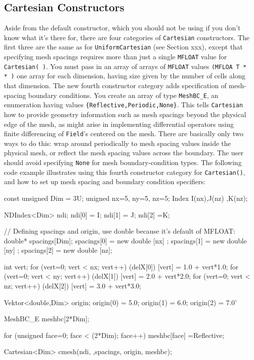 \subsection{Cartesian Constructors} 
Aside from the default constructor, which you should not be using if you don't know what it's there for, there are four categories of \texttt{Cartesian} constructors. 
The first three are the same as for \texttt{UniformCartesian} (see Section xxx), except that specifying mesh spacings requires more than just a single \texttt{MFLOAT} value for \texttt{Cartesian( )}. 
You must pass in an array of arrays of \texttt{MFLOAT} values \texttt{(MFLOA T * * )} one array for each dimension, having size given by the number of cells along that dimension. 
The new fourth constructor category adds specification of mesh-spacing boundary conditions. 
You create an array of type \texttt{MeshBC\_E}, an enumeration having values \texttt{\{Reflective,Periodic,None\}}. This tells \texttt{Cartesian} how to provide geometry information such as 
mesh spacings beyond the physical edge of the mesh, as might arise in implementing differential operators using finite differencing of \texttt{Field}'s centered on the mesh. There are 
basically only two ways to do this: wrap around periodically to mesh spacing values inside the physical mesh, or reflect the mesh spacing values across the boundary. The user should 
avoid specifying \texttt{None} for mesh boundary-condition types. The following code example illustrates using this fourth constructor category for \texttt{Cartesian()}, and how to set up 
mesh spacing and boundary condition specifiers: 
\begin{smallcode}

const unsigned Dim = 3U;
unigned nx=5, ny=5, nz=5; 
Index I(nx),J(nz) ,K(nz);

NDIndex<Dim> ndi; 
ndi[0] = I; ndi[1] = J; ndi[2] =K; 

// Defining spacings and origin, use double because it's default of MFLOAT: 
double* spacings[Dim]; 
spacings[0] = new double [nx] ; 
spacings[1] = new double [ny] ; 
spacings[2] = new double [nz];
 
int vert; 
for (vert=0; vert < nx; vert++) (delX[0]) [vert] = 1.0 + vert*1.0;
for (vert=0; vert < ny; vert++) (delX[1]) [vert] = 2.0 + vert*2.0;
for (vert=0; vert < nz; vert++) (delX[2]) [vert] = 3.0 + vert*3.0;

Vektor<double,Dim> origin; 
origin(0) = 5.0; 
origin(1) = 6.0; 
origin(2) = 7.0'

MeshBC_E meshbc[2*Dim];
 
for (unsigned face=0; face < (2*Dim); face++) 
 meshbc[face] =Reflective; 
 
Cartesian<Dim> cmesh(ndi, ,spacings, origin, meshbc); 

\end{smallcode}
